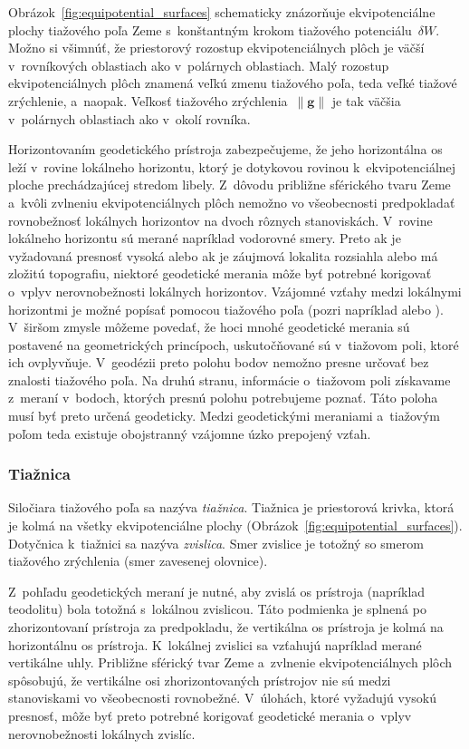 \documentclass[a4paper, 12pt]{book}
\let\vec\mathbf
\begin{document}
Obrázok~\ref{fig:equipotential_surfaces} schematicky znázorňuje ekvipotenciálne 
plochy tiažového poľa Zeme s~konštantným krokom tiažového potenciálu~$\delta 
W$.  Možno si všimnúť, že priestorový rozostup ekvipotenciálnych plôch je väčší 
v~rovníkových oblastiach ako v~polárnych oblastiach.  Malý rozostup 
ekvipotenciálnych plôch znamená veľkú zmenu tiažového poľa, teda veľké tiažové 
zrýchlenie, a~naopak.  Veľkosť tiažového zrýchlenia~$\| \vec g \|$ je tak 
väčšia v~polárnych oblastiach ako v~okolí rovníka.

Horizontovaním geodetického prístroja zabezpečujeme, že jeho horizontálna os 
leží v~rovine lokálneho horizontu, ktorý je dotykovou rovinou 
k~ekvipotenciálnej ploche prechádzajúcej stredom libely.  Z~dôvodu približne 
sférického tvaru Zeme a~kvôli zvlneniu ekvipotenciálnych plôch nemožno vo 
všeobecnosti predpokladať rovnobežnosť lokálnych horizontov na dvoch rôznych 
stanoviskách.  V~rovine lokálneho horizontu sú merané napríklad vodorovné 
smery.  Preto ak je vyžadovaná presnosť vysoká alebo ak je záujmová lokalita 
rozsiahla alebo má zložitú topografiu, niektoré geodetické merania môže byť 
potrebné korigovať o~vplyv nerovnobežnosti lokálnych horizontov.  Vzájomné 
vzťahy medzi lokálnymi horizontmi je možné popísať pomocou tiažového poľa 
(pozri napríklad \cite{VanicekGeodesy} alebo \cite{MoritzPhysicalGeodesy}).  
V~širšom zmysle môžeme povedať, že hoci mnohé geodetické merania sú postavené 
na geometrických princípoch, uskutočňované sú v~tiažovom poli, ktoré ich 
ovplyvňuje.  V~geodézii preto polohu bodov nemožno presne určovať bez znalosti 
tiažového poľa.  Na druhú stranu, informácie o~tiažovom poli získavame z~meraní 
v~bodoch, ktorých presnú polohu potrebujeme poznať.  Táto poloha musí byť preto 
určená geodeticky.  Medzi geodetickými meraniami a~tiažovým poľom teda existuje 
obojstranný vzájomne úzko prepojený vzťah.

\subsubsection{Tiažnica}
\label{sec:plumbline}

Siločiara tiažového poľa sa nazýva \emph{tiažnica}.  Tiažnica je priestorová 
krivka, ktorá je kolmá na všetky ekvipotenciálne plochy 
(Obrázok~\ref{fig:equipotential_surfaces}).  Dotyčnica k~tiažnici sa nazýva 
\emph{zvislica}.  Smer zvislice je totožný so smerom tiažového zrýchlenia (smer 
zavesenej olovnice).

Z~pohľadu geodetických meraní je nutné, aby zvislá os prístroja (napríklad 
teodolitu) bola totožná s~lokálnou zvislicou.  Táto podmienka je splnená po 
zhorizontovaní prístroja za predpokladu, že vertikálna os prístroja je kolmá na 
horizontálnu os prístroja.  K~lokálnej zvislici sa vzťahujú napríklad merané 
vertikálne uhly.  Približne sférický tvar Zeme a~zvlnenie ekvipotenciálnych 
plôch spôsobujú, že vertikálne osi zhorizontovaných prístrojov nie sú medzi 
stanoviskami vo všeobecnosti rovnobežné.  V~úlohách, ktoré vyžadujú vysokú 
presnosť, môže byť preto potrebné korigovať geodetické merania o~vplyv 
nerovnobežnosti lokálnych zvislíc.
\end{document}

